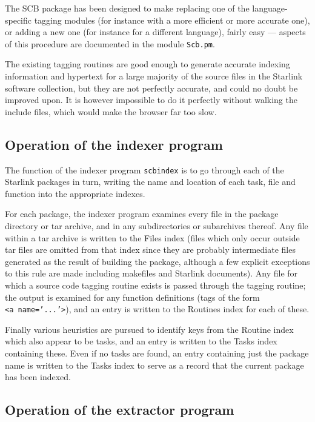 \documentclass[twoside,11pt]{article}
\newcommand{\xlabel}[1]{}
\renewcommand{\_}{\texttt{\symbol{95}}}
\begin{document}
The SCB package has been designed to make
replacing one of the language-specific tagging modules 
(for instance with a more efficient or more accurate one),
or adding a new one (for instance for a different language), 
fairly easy --- aspects of this 
procedure are documented in the module {\tt Scb.pm}.

The existing tagging routines are good enough to generate 
accurate indexing information and hypertext 
for a large majority of the source files in the
Starlink software collection, but they are not perfectly accurate,
and could no doubt be improved upon.
It is however impossible to do it perfectly without walking the
include files, which would make the browser far too slow.



\subsection{\xlabel{sec:internals-indexer}\label{sec:internals-indexer}Operation of the indexer program}

The function of the indexer program {\tt scbindex} 
is to go through
each of the Starlink packages in turn, writing the name and 
location of each task, file and function into the appropriate 
indexes.

For each package, the indexer program examines 
every file in the package directory or tar archive, 
and in any subdirectories or subarchives thereof.
Any file within a tar archive 
is written to the Files index
(files which only occur outside tar files are omitted
from that index since they are probably intermediate files 
generated as the result of building the package, although
a few explicit exceptions to this rule are made 
including makefiles and Starlink documents). 
Any file for which a
source code tagging routine exists
is passed through the tagging routine;
the output is examined for any function definitions 
(tags of the form {\tt <a~name='...'>}), 
and an entry is written to the Routines index for each of these.

Finally various heuristics are pursued to identify
keys from the Routine index which also appear to be tasks, 
and an entry is written to the Tasks index containing these.
Even if no tasks are found, an entry containing just the package
name is written to the Tasks index to serve as a record that 
the current package has been indexed.


\subsection{\xlabel{sec:internals-extractor}\label{sec:internals-extractor}Operation of the extractor program}
\end{document}
